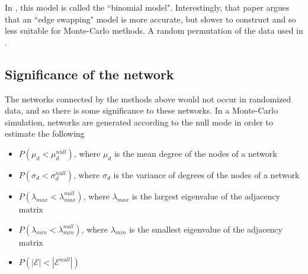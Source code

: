 \documentclass[10pt]{article}
\theoremstyle{definition}
\numberwithin{theorem}{section}
\numberwithin{definition}{section}
\numberwithin{lemma}{section}
\numberwithin{corollary}{section}
\numberwithin{clm}{section}
\numberwithin{rmk}{section}
\newcommand{\cE}{\mathcal{E}}
\begin{document}
In \cite{coocc}, this model is called the ``binomial model". Interestingly, that paper argues that an ``edge swapping" model is more accurate, but slower to construct and so less suitable for Monte-Carlo methods. A random permutation of the data used in \cite{gut}.

\subsection{Significance of the network}\label{sig}
The networks connected by the methods above would not occur in randomized data, and so there is some significance to these networks. In a Monte-Carlo simulation, networks are generated according to the null mode in order to estimate the following
\begin{itemize}
	\item $P(\mu_d < \mu_d^{null})$, where $\mu_d$ is the mean degree of the nodes of a network
	\item $P(\sigma_d < \sigma_d^{null})$, where $\sigma_d$ is the variance of degrees of the nodes of a network
	\item $P(\lambda_{max} < \lambda_{max}^{null})$, where $\lambda_{max}$ is the largest eigenvalue of the adjacency matrix
	\item $P(\lambda_{min} < \lambda_{min}^{null})$, where $\lambda_{min}$ is the smallest eigenvalue of the adjacency matrix
	\item $P(|\cE| < |\cE^{null}|)$
\end{itemize} 
\end{document}
